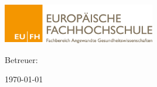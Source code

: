 \thispagestyle{plain}

\begin{titlepage}
	\centering
	\includegraphics[width=0.5\textwidth]{img/EUFHTitle.png}\par\vspace{1cm}
	{\scshape\LARGE \institution\par}
	\vspace{1cm}
	{\scshape\Large \autorStudiengang\par}
	\vspace{1.5cm}
	{\huge\bfseries \titleDoc\par}
	\vspace{2cm}
	{\Large\itshape \autor\par}
	\vfill
	Betreuer: \par
	\textsc{\prueferA}
	
	\vfill
	
	{\large \today\par}
\end{titlepage}

